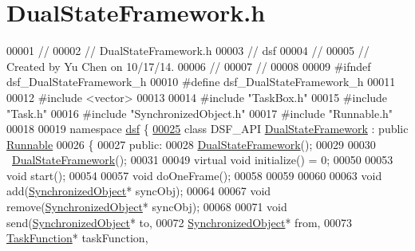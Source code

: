 \hypertarget{_dual_state_framework_8h_source}{}\section{Dual\+State\+Framework.\+h}
\label{_dual_state_framework_8h_source}

\begin{DoxyCode}
00001 \textcolor{comment}{//}
00002 \textcolor{comment}{//  DualStateFramework.h}
00003 \textcolor{comment}{//  dsf}
00004 \textcolor{comment}{//}
00005 \textcolor{comment}{//  Created by Yu Chen on 10/17/14.}
00006 \textcolor{comment}{//}
00007 \textcolor{comment}{//}
00008 
00009 \textcolor{preprocessor}{#ifndef dsf\_DualStateFramework\_h}
00010 \textcolor{preprocessor}{#define dsf\_DualStateFramework\_h}
00011 
00012 \textcolor{preprocessor}{#include <vector>}
00013 
00014 \textcolor{preprocessor}{#include "TaskBox.h"}
00015 \textcolor{preprocessor}{#include "Task.h"}
00016 \textcolor{preprocessor}{#include "SynchronizedObject.h"}
00017 \textcolor{preprocessor}{#include "Runnable.h"}
00018 
00019 \textcolor{keyword}{namespace }\hyperlink{namespacedsf}{dsf} \{
\hypertarget{_dual_state_framework_8h_source_l00025}{}\hyperlink{classdsf_1_1_dual_state_framework}{00025}     \textcolor{keyword}{class }DSF\_API \hyperlink{classdsf_1_1_dual_state_framework}{DualStateFramework} : \textcolor{keyword}{public} \hyperlink{classdsf_1_1_runnable}{Runnable}
00026     \{
00027     \textcolor{keyword}{public}:
00028         \hyperlink{namespacedsf_a68ac3b6a0526bfa7f6a412918afb1841}{DualStateFramework}();
00029         
00030         ~\hyperlink{classdsf_1_1_dual_state_framework}{DualStateFramework}();
00031         
00049         \textcolor{keyword}{virtual} \textcolor{keywordtype}{void} initialize() = 0;
00050         
00053         \textcolor{keywordtype}{void} start();
00054         
00057         \textcolor{keywordtype}{void} doOneFrame();
00058         
00059         
00060         
00063         \textcolor{keywordtype}{void} add(\hyperlink{classdsf_1_1_synchronized_object}{SynchronizedObject}* syncObj);
00064         
00067         \textcolor{keywordtype}{void} \textcolor{keyword}{remove}(\hyperlink{classdsf_1_1_synchronized_object}{SynchronizedObject}* syncObj);
00068         
00071         \textcolor{keywordtype}{void} send(\hyperlink{classdsf_1_1_synchronized_object}{SynchronizedObject}* to,
00072                   \hyperlink{classdsf_1_1_synchronized_object}{SynchronizedObject}* from,
00073                   \hyperlink{namespacedsf_aa16e735f29587f4485b56fc46746f7a9}{TaskFunction}* taskFunction,

\end{DoxyCode}
